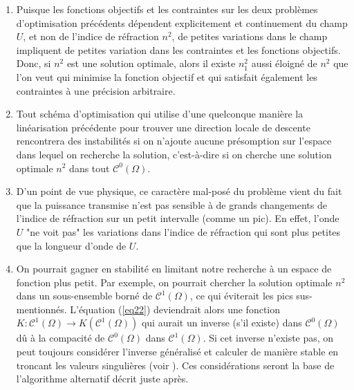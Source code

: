 \documentclass{article}
\begin{document}
\begin{enumerate}
\item Puisque les fonctions objectifs et les contraintes sur les deux problèmes d'optimisation précédents dépendent explicitement et continuement du champ $U$, et non de l'indice de réfraction $n^2$, de petites variations dans le champ impliquent de petites variation dans les contraintes et les fonctions objectifs. Donc, si $n^2$ est une solution optimale, alors il existe $n_1^2$ aussi éloigné de $n^2$ que l'on veut qui minimise la fonction objectif et qui satisfait également les contraintes à une précision arbitraire.
\item Tout schéma d'optimisation qui utilise d'une quelconque manière la linéarisation précédente pour trouver une direction locale de descente rencontrera des instabilités si on n'ajoute aucune présomption sur l'espace dans lequel on recherche la solution, c'est-à-dire si on cherche une solution optimale $n^2$ dans tout $\mathscr{C}^0(\Omega)$.
\item D'un point de vue physique, ce caractère mal-posé du problème vient du fait que la puissance transmise n'est pas sensible à de grands changements de l'indice de réfraction sur un petit intervalle (comme un pic). En effet, l'onde $U$ "ne voit pas" les variations dans l'indice de réfraction qui sont plus petites que la longueur d'onde de $U$.
\item On pourrait gagner en stabilité en limitant notre recherche à un espace de fonction plus petit. Par exemple, on pourrait chercher la solution optimale $n^2$ dans un sous-ensemble borné de $\mathscr{C}^1(\Omega)$, ce qui éviterait les pics sus-mentionnés. L'équation (\ref{eq22}) deviendrait alors une fonction $K : \mathscr{C}^1(\Omega)\to K(\mathscr{C}^1(\Omega))$ qui aurait un inverse (s'il existe) dans $\mathscr{C}^0(\Omega)$ dû à la compacité de $\mathscr{C}^0(\Omega)$ dans $\mathscr{C}^1(\Omega)$. Si cet inverse n'existe pas, on peut toujours considérer l'inverse généralisé et calculer de manière stable en troncant les valeurs singulières (voir \cite{engl96regu}). Ces considérations seront la base de l'algorithme alternatif décrit juste après.
\end{enumerate}
\end{document}
